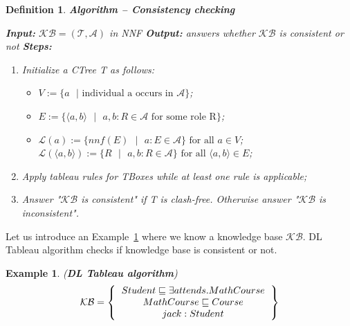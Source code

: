 \documentclass[12pt,a4paper]{article}
\newtheorem{definition}{Definition}[subsection]
\newtheorem{example}{Example}[subsection]
\begin{document}
\begin{definition}{\textbf{Algorithm -- Consistency checking}}
	\label{def:consistency}

\textbf{Input:} $\mathcal{KB} = (\mathcal{T}, \mathcal{A})$ in NNF \newline
\indent \textbf{Output:} answers whether $\mathcal{KB}$ is consistent or not \newline
\indent \textbf{Steps:}
\begin{enumerate}
	\item Initialize a CTree T as follows:
		\begin{itemize}
			\item $V := \{ a \text{ } | \text{ individual a occurs in } \mathcal{A} \}$;
			\item $E := \{ \langle a,b \rangle \text{ } | \text{ } a,b : R \in \mathcal{A} \text{ for some role R} \}$;
			\item $\mathcal{L}(a) := \{ nnf(E) \text{ } | \text{ } a:E \in \mathcal{A}\} \text{ for all } a \in V$; \newline
			$\mathcal{L}(\langle a,b \rangle) := \{ R \text{ } | \text{ } a,b:R \in \mathcal{A}\} \text{ for all } \langle a,b \rangle \in E$;
		\end{itemize}
	\item Apply tableau rules for TBoxes while at least one rule is applicable;
	\item Answer "$\mathcal{KB}$ is consistent" if T is clash-free. Otherwise answer "$\mathcal{KB}$ is inconsistent".
\end{enumerate}

\end{definition}

Let us introduce an Example~\ref{example:dlTableau} where we know a knowledge base $\mathcal{KB}$. DL Tableau algorithm checks if knowledge base is consistent or not.

\begin{example}{(\textbf{DL Tableau algorithm})}
	\label{example:dlTableau}
	\[ 
	\mathcal{KB} = \left\{
	\begin{tabular}{c c}
	$Student \sqsubseteq \exists attends.MathCourse$ \\
	$MathCourse \sqsubseteq Course$ \\
	$jack : Student$ \\
	\end{tabular}
	\right \}
	\] \\
\end{example}
\end{document}

